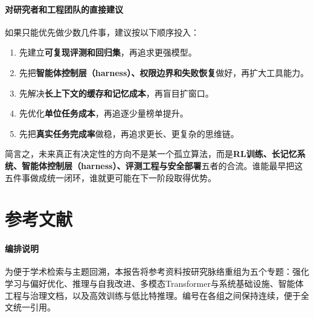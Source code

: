 \documentclass[12pt,a4paper]{article}
\begin{document}
\paragraph{对研究者和工程团队的直接建议}

如果只能优先做少数几件事，建议按以下顺序投入：
\begin{enumerate}
    \item 先建立\textbf{可复现评测和回归集}，再追求更强模型。
    \item 先把\textbf{智能体控制层（harness）、权限边界和失败恢复}做好，再扩大工具能力。
    \item 先解决\textbf{长上下文的缓存和记忆成本}，再盲目扩窗口。
    \item 先优化\textbf{单位任务成本}，再追逐少量榜单提升。
    \item 先把\textbf{真实任务完成率}做稳，再追求更长、更复杂的思维链。
\end{enumerate}

简言之，未来真正有决定性的方向不是某一个孤立算法，而是\textbf{RL训练、长记忆系统、智能体控制层（harness）、评测工程与安全部署}五者的合流。谁能最早把这五件事做成统一闭环，谁就更可能在下一阶段取得优势。

\section*{参考文献}

\paragraph{编排说明}

为便于学术检索与主题回溯，本报告将参考资料按研究脉络重组为五个专题：强化学习与偏好优化、推理与自我改进、多模态Transformer与系统基础设施、智能体工程与治理文档，以及高效训练与低比特推理。编号在各组之间保持连续，便于全文统一引用。

\begingroup
\small
\sloppy
\end{document}

